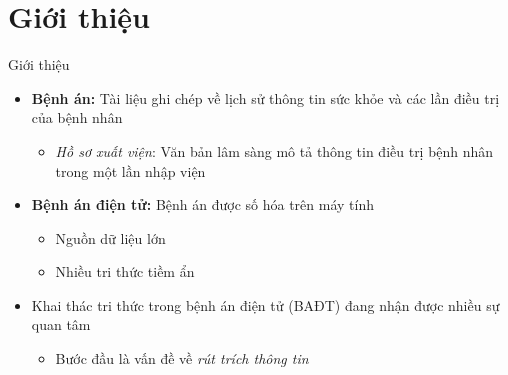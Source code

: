 \section{Giới thiệu}
\begin{frame}{Giới thiệu}
\putlogo
\begin{itemize}
	\item \textbf{Bệnh án:} Tài liệu ghi chép về lịch sử thông tin sức khỏe và các lần điều trị của bệnh nhân 
	\begin{itemize}
		\item \textit{Hồ sơ xuất viện}: Văn bản lâm sàng mô tả thông tin điều trị bệnh nhân trong một lần nhập viện
	\end{itemize}
	\item \textbf{Bệnh án điện tử:} Bệnh án được số hóa trên máy tính
	\begin{itemize}
		\item Nguồn dữ liệu lớn
		\item Nhiều tri thức tiềm ẩn
	\end{itemize}
	\item Khai thác tri thức trong bệnh án điện tử (BAĐT) đang nhận được nhiều sự quan tâm
	\begin{itemize}
		\item Bước đầu là vấn đề về \emph{rút trích thông tin}
	\end{itemize}		
\end{itemize}
\end{frame}


